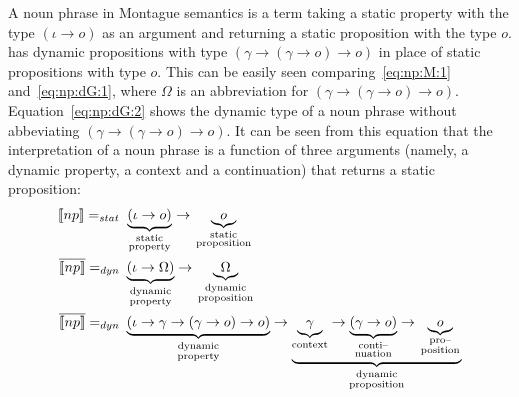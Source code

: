 A noun phrase in Montague semantics is a term taking a static property with the type $(\iota \rightarrow o)$ as an argument and returning a static proposition with the type $o$. {\TDL} has dynamic propositions with type $(\gamma \rightarrow (\gamma \rightarrow o) \rightarrow o)$ in place of static propositions with type $o$.
This can be easily seen comparing~\eqref{eq:np:M:1} and~\eqref{eq:np:dG:1}, where $\Omega$ is an abbreviation for $(\gamma \rightarrow (\gamma \rightarrow o) \rightarrow o)$.
Equation~\eqref{eq:np:dG:2} shows the dynamic type of a noun phrase without abbeviating $(\gamma \rightarrow (\gamma \rightarrow o) \rightarrow o)$. It can be seen from this equation that the interpretation of a noun phrase is a function of three arguments (namely, a dynamic property, a context and a continuation) that returns a static proposition:
\begin{subequations}
\begin{align}
[\![np]\!] =_{stat} \ & \underbrace{(\iota \rightarrow   o)}_{
\begin{smallmatrix}
\text{static}\\
\text{property}
\end{smallmatrix}} \rightarrow \underbrace{o}_{\begin{smallmatrix} 
\text{static}\\
\text{proposition}
\end{smallmatrix}} \label{eq:np:M:1} \\
\overline{[\![np]\!]} =_{dyn} \ & \underbrace{(\iota \rightarrow  \Omega )}_{\begin{smallmatrix}
\text{dynamic}\\
\text{property}
\end{smallmatrix}} \rightarrow \underbrace{\Omega}_{
\begin{smallmatrix}
\text{dynamic}\\
\text{proposition}
\end{smallmatrix}} \label{eq:np:dG:1} \\
\overline{[\![np]\!]} =_{dyn} \ & \underbrace{(\iota \rightarrow \gamma \rightarrow (\gamma \rightarrow o) \rightarrow o)}_{
\begin{smallmatrix}
\text{dynamic}\\
\text{property}
\end{smallmatrix}} \rightarrow \underbrace{\underbrace{\gamma}_{\text{context}} \rightarrow \underbrace{(\gamma \rightarrow o)}_{\begin{smallmatrix}
\text{conti--}\\
\text{nuation}
\end{smallmatrix}} \rightarrow \underbrace{o}_{\begin{smallmatrix}
\text{pro--}\\
\text{position}
\end{smallmatrix}}}_{\begin{smallmatrix}
\text{dynamic}\\
\text{proposition}
\end{smallmatrix}} \label{eq:np:dG:2}
\end{align}
\label{eq:np:MdG}
\end{subequations}

